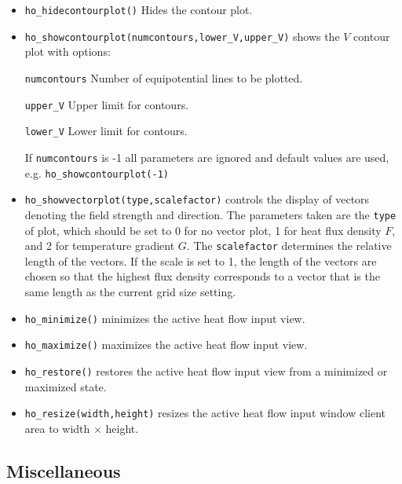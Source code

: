 \begin{itemize}
\item \texttt{ho\_hidecontourplot()} Hides the contour plot.

\item \texttt{ho\_showcontourplot(numcontours,lower{\_}V,upper{\_}V)} shows the
$V$ contour plot with options:

\texttt{numcontours} Number of equipotential lines to be plotted.

\texttt{upper{\_}V} Upper limit for contours.

\texttt{lower{\_}V} Lower limit for contours.

If \texttt{numcontours} is -1 all parameters are ignored and
default values are used, \\ e.g. \texttt{ho\_showcontourplot(-1)}

\item \texttt{ho\_showvectorplot(type,scalefactor)}
controls the display of vectors denoting the field strength and
direction. The parameters taken are the \texttt{type} of plot,
which should be set to 0 for no vector plot, 1 for heat flux density
$F$, and 2 for temperature gradient $G$. The \texttt{scalefactor}
determines the relative length of the vectors. If the scale is set
to 1, the length of the vectors are chosen so that the highest flux
density corresponds to a vector that is the same length as the
current grid size setting.

\item{\tt ho\_minimize()} minimizes the active heat flow input view.

\item{\tt ho\_maximize()} maximizes the active heat flow input view.

\item{\tt ho\_restore()} restores the active heat flow input view from a
 minimized or maximized state.

\item{\tt ho\_resize(width,height)} resizes the active heat flow input
 window client area to width $\times$ height.

\end{itemize}

\subsection{Miscellaneous}

